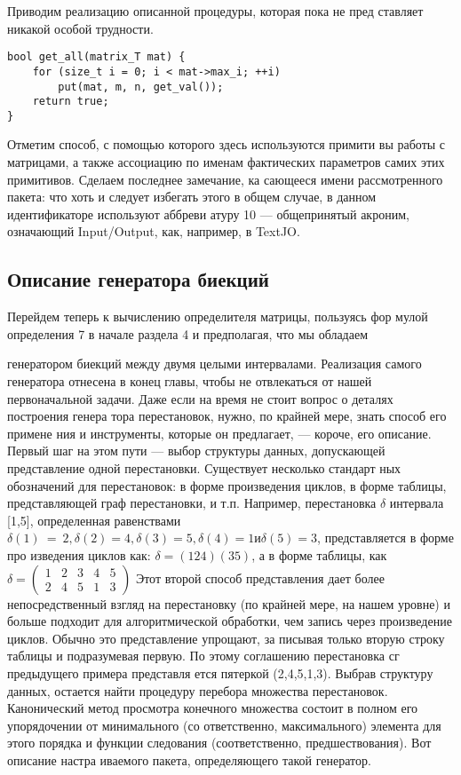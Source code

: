 Приводим реализацию описанной процедуры, которая пока не пред­
ставляет никакой особой трудности.
\begin{lstlisting}
bool get_all(matrix_T mat) {
	for (size_t i = 0; i < mat->max_i; ++i)
		put(mat, m, n, get_val());
	return true;
}
\end{lstlisting}

Отметим способ, с помощью которого здесь используются примити­
вы работы с матрицами, а также ассоциацию по именам фактических
параметров самих этих примитивов. Сделаем последнее замечание, ка­
сающееся имени рассмотренного пакета: что хоть и следует избегать
этого в общем случае, в данном идентификаторе используют аббреви­
атуру 10 — общепринятый акроним, означающий Input/Output, как,
например, в TextJO.

\subsection{Описание генератора биекций}

Перейдем теперь к вычислению определителя матрицы, пользуясь фор­
мулой определения 7 в начале раздела 4 и предполагая, что мы обладаем

\newpage

генератором биекций между двумя целыми интервалами. Реализация
самого генератора отнесена в конец главы, чтобы не отвлекаться от
нашей первоначальной задачи.
Даже если на время не стоит вопрос о деталях построения генера­
тора перестановок, нужно, по крайней мере, знать способ его примене­
ния и инструменты, которые он предлагает, — короче, его описание.
Первый шаг на этом пути — выбор структуры данных, допускающей
представление одной перестановки. Существует несколько стандарт­
ных обозначений для перестановок: в форме произведения циклов, в
форме таблицы, представляющей граф перестановки, и т.п. Например,
перестановка $\delta$ интервала [1,5], определенная равенствами $\delta(1)~=~2,
\delta(2) = 4, \delta(3) = 5, \delta(4) = 1 и \delta(5) = 3$, представляется в форме про­
изведения циклов как: $\delta = ( 1 2 4 )( 3 5 )$, а в форме таблицы, как
$\delta = \begin{pmatrix} 1 & 2 & 3 & 4 & 5 \\ 2 & 4 & 5 & 1 & 3 \end{pmatrix} $
Этот второй способ представления дает более
непосредственный взгляд на перестановку (по крайней мере, на нашем
уровне) и больше подходит для алгоритмической обработки, чем запись
через произведение циклов. Обычно это представление упрощают, за­
писывая только вторую строку таблицы и подразумевая первую. По
этому соглашению перестановка сг предыдущего примера представля­
ется пятеркой (2,4,5,1,3).
Выбрав структуру данных, остается найти процедуру перебора
множества перестановок. Канонический метод просмотра конечного
множества состоит в полном его упорядочении от минимального (со­
ответственно, максимального) элемента для этого порядка и функции
следования (соответственно, предшествования). Вот описание настра­
иваемого пакета, определяющего такой генератор.


